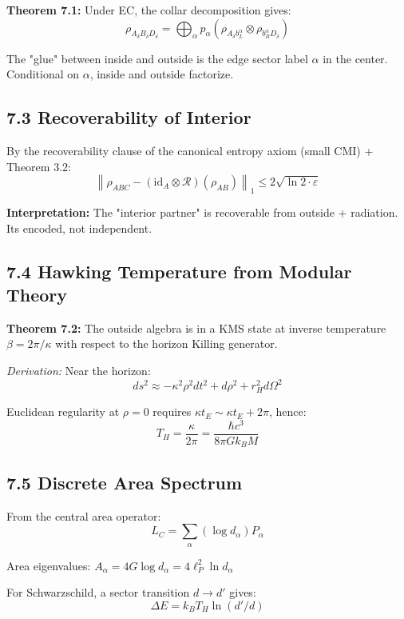 \textbf{Theorem 7.1:} Under EC, the collar decomposition gives: \[\rho_{A_\delta B_\delta D_\delta} = \bigoplus_\alpha p_\alpha \left(\rho_{A_\delta b_L^\alpha} \otimes \rho_{b_R^\alpha D_\delta}\right)\]

The "glue" between inside and outside is the edge sector label \(\alpha\) in the center. Conditional on \(\alpha\), inside and outside factorize.

\subsection{7.3 Recoverability of Interior}\label{73-recoverability-of-interior}

By the recoverability clause of the canonical entropy axiom (small CMI) + Theorem 3.2: \[\left\|\rho_{ABC} - (\text{id}_A \otimes \mathcal{R})(\rho_{AB})\right\|_1 \leq 2\sqrt{\ln 2 \cdot \varepsilon}\]

\textbf{Interpretation:} The "interior partner" is recoverable from outside + radiation. It\textquotesingle s encoded, not independent.

\subsection{7.4 Hawking Temperature from Modular Theory}\label{74-hawking-temperature-from-modular-theory}

\textbf{Theorem 7.2:} The outside algebra is in a KMS state at inverse temperature \(\beta = 2\pi/\kappa\) with respect to the horizon Killing generator.

\emph{Derivation:} Near the horizon: \[ds^2 \approx -\kappa^2 \rho^2 dt^2 + d\rho^2 + r_H^2 d\Omega^2\]

Euclidean regularity at \(\rho = 0\) requires \(\kappa t_E \sim \kappa t_E + 2\pi\), hence: \[T_H = \frac{\kappa}{2\pi} = \frac{\hbar c^3}{8\pi G k_B M}\]

\subsection{7.5 Discrete Area Spectrum}\label{75-discrete-area-spectrum}

From the central area operator: \[L_C = \sum_\alpha (\log d_\alpha) P_\alpha\]

Area eigenvalues: \(A_\alpha = 4G \log d_\alpha = 4\ell_P^2 \ln d_\alpha\)

For Schwarzschild, a sector transition \(d \to d'\) gives: \[\Delta E = k_B T_H \ln(d'/d)\]

